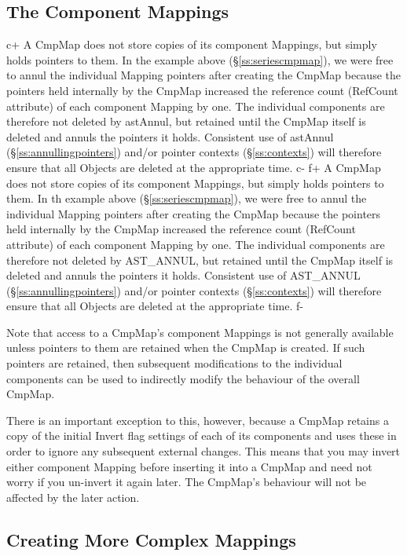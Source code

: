 \documentclass[twoside,11pt]{article}
\newcommand{\secref}[1]{\S\ref{#1}}
\newcommand{\secref}[1]{\ref{#1}}
\begin{document}
\subsection{\label{ss:cmpmapcomponents}The Component Mappings}

c+
A CmpMap does not store copies of its component Mappings, but simply
holds pointers to them. In the example above
(\secref{ss:seriescmpmap}), we were free to annul the individual
Mapping pointers after creating the CmpMap because the pointers held
internally by the CmpMap increased the reference count (RefCount
attribute) of each component Mapping by one. The individual components
are therefore not deleted by astAnnul, but retained until the CmpMap
itself is deleted and annuls the pointers it holds. Consistent use of
astAnnul (\secref{ss:annullingpointers}) and/or pointer contexts
(\secref{ss:contexts}) will therefore ensure that all Objects are
deleted at the appropriate time.
c-
f+
A CmpMap does not store copies of its component Mappings, but simply
holds pointers to them. In th example above (\secref{ss:seriescmpmap}),
we were free to annul the individual Mapping pointers after creating
the CmpMap because the pointers held internally by the CmpMap
increased the reference count (RefCount attribute) of each component
Mapping by one. The individual components are therefore not deleted by
AST\_ANNUL, but retained until the CmpMap itself is deleted and annuls
the pointers it holds. Consistent use of AST\_ANNUL
(\secref{ss:annullingpointers}) and/or pointer contexts
(\secref{ss:contexts}) will therefore ensure that all Objects are
deleted at the appropriate time.
f-

Note that access to a CmpMap's component Mappings is not generally
available unless pointers to them are retained when the CmpMap is
created. If such pointers are retained, then subsequent modifications
to the individual components can be used to indirectly modify the
behaviour of the overall CmpMap.

There is an important exception to this, however, because a CmpMap
retains a copy of the initial Invert flag settings of each of its
components and uses these in order to ignore any subsequent external
changes. This means that you may invert either component Mapping
before inserting it into a CmpMap and need not worry if you un-invert
it again later. The CmpMap's behaviour will not be affected by the
later action.

\subsection{\label{ss:complexcmpmap}Creating More Complex Mappings}
\end{document}
